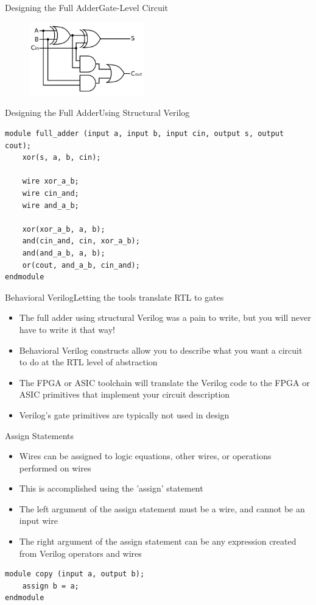 \documentclass{beamer}
\begin{document}
\begin{frame}{Designing the Full Adder}{Gate-Level Circuit}
\begin{figure}[H]
\centering\includegraphics[width=5cm]{full_adder_schematic.png}
\end{figure}
\end{frame}

\begin{frame}[fragile]{Designing the Full Adder}{Using Structural Verilog}
\begin{verbatim}
module full_adder (input a, input b, input cin, output s, output cout);
	xor(s, a, b, cin);
	
	wire xor_a_b;
	wire cin_and;
	wire and_a_b;
	
	xor(xor_a_b, a, b);
	and(cin_and, cin, xor_a_b);
	and(and_a_b, a, b);
	or(cout, and_a_b, cin_and);
endmodule
\end{verbatim}
\end{frame}

\begin{frame}{Behavioral Verilog}{Letting the tools translate RTL to gates}
	\begin{itemize}
		\item The full adder using structural Verilog was a pain to write, but you will never have to write it that way!
		\item Behavioral Verilog constructs allow you to describe what you want a circuit to do at the RTL level of abstraction
		\item The FPGA or ASIC toolchain will translate the Verilog code to the FPGA or ASIC primitives that implement your circuit description
		\item Verilog's gate primitives are typically not used in design
	\end{itemize}
\end{frame}

\begin{frame}[fragile]{Assign Statements}
	\begin{itemize}
		\item Wires can be assigned to logic equations, other wires, or operations performed on wires
		\item This is accomplished using the 'assign' statement
		\item The left argument of the assign statement must be a wire, and cannot be an input wire
		\item The right argument of the assign statement can be any expression created from Verilog operators and wires
	\end{itemize}
\begin{verbatim}
module copy (input a, output b);
	assign b = a;
endmodule
\end{verbatim}
\end{frame}
\end{document}
